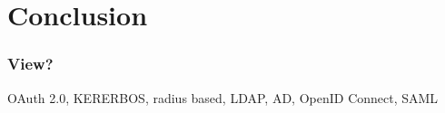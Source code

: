 \chapter{Conclusion}

\subsection{View?}

OAuth 2.0, KERERBOS, radius based, LDAP, AD, OpenID Connect, SAML